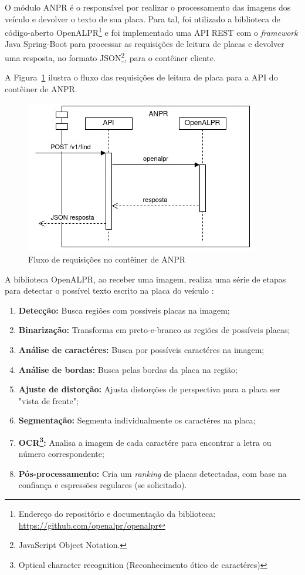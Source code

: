 \documentclass[12pt]{article}
\begin{document}
O módulo ANPR é o responsável por realizar o processamento das imagens dos veículo e devolver o texto de sua placa. Para tal, foi utilizado a biblioteca de código-aberto OpenALPR\footnote{Endereço do repositório e documentação da biblioteca: \url{https://github.com/openalpr/openalpr}} e foi implementado uma API REST com o \textit{framework} Java Spring-Boot para processar as requisições de leitura de placas e devolver uma resposta, no formato JSON\footnote{JavaScript Object Notation.}, para o contêiner cliente.

A Figura~\ref{fig:anpr4j-data} ilustra o fluxo das requisições de leitura de placa para a API do contêiner de ANPR.

\begin{figure}[ht]
	\centering
	\includegraphics[width=.8\textwidth]{anpr4j-data.jpg}
	\caption{Fluxo de requisições no contêiner de ANPR}
	\label{fig:anpr4j-data}
\end{figure}

A biblioteca OpenALPR, ao receber uma imagem, realiza uma série de etapas para detectar o possível texto escrito na placa do veículo \cite{openalprdesign}:

\begin{enumerate}
	\item \textbf{Detecção:} Busca regiões com possíveis placas na imagem;
	\item \textbf{Binarização:} Transforma em preto-e-branco as regiões de possíveis placas;
	\item \textbf{Análise de caractéres:} Busca por possíveis caractéres na imagem;
	\item \textbf{Análise de bordas:} Busca pelas bordas da placa na região;
	\item \textbf{Ajuste de distorção:} Ajusta distorções de perspectiva para a placa ser "vista de frente";
	\item \textbf{Segmentação:} Segmenta individualmente os caractéres na placa;
	\item \textbf{OCR\footnote{Optical character recognition (Reconhecimento ótico de caractéres)}:} Analisa a imagem de cada caractére para encontrar a letra ou número correspondente;
	\item \textbf{Pós-processamento:} Cria um \textit{ranking} de placas detectadas, com base na confiança e espressões regulares (se solicitado).
\end{enumerate}
\end{document}
